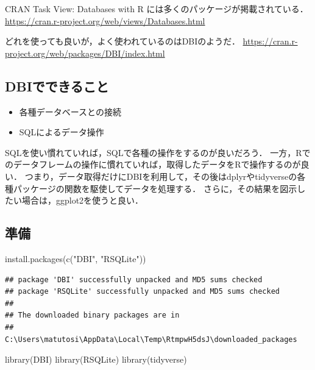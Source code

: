 \documentclass[
]{article}
\newenvironment{Shaded}{\begin{snugshade}}{\end{snugshade}}
\newcommand{\FunctionTok}[1]{\textcolor[rgb]{0.00,0.00,0.00}{#1}}
\newcommand{\NormalTok}[1]{#1}
\newcommand{\StringTok}[1]{\textcolor[rgb]{0.31,0.60,0.02}{#1}}
\providecommand{\tightlist}{%
  \setlength{\itemsep}{0pt}\setlength{\parskip}{0pt}}
\begin{document}
CRAN Task View: Databases with R には多くのパッケージが掲載されている．
\url{https://cran.r-project.org/web/views/Databases.html}

どれを使っても良いが，よく使われているのはDBIのようだ．
\url{https://cran.r-project.org/web/packages/DBI/index.html}

\hypertarget{dbiux3067ux3067ux304dux308bux3053ux3068}{%
\subsection{DBIでできること}\label{dbiux3067ux3067ux304dux308bux3053ux3068}}

\begin{itemize}
\tightlist
\item
  各種データベースとの接続\\
\item
  SQLによるデータ操作
\end{itemize}

SQLを使い慣れていれば，SQLで各種の操作をするのが良いだろう．
一方，Rでのデータフレームの操作に慣れていれば，取得したデータをRで操作するのが良い．
つまり，データ取得だけにDBIを利用して，その後はdplyrやtidyverseの各種パッケージの関数を駆使してデータを処理する．
さらに，その結果を図示したい場合は，ggplot2を使うと良い．

\hypertarget{ux6e96ux5099-5}{%
\subsection{準備}\label{ux6e96ux5099-5}}

\begin{Shaded}
\begin{Highlighting}[]
\FunctionTok{install.packages}\NormalTok{(}\FunctionTok{c}\NormalTok{(}\StringTok{"DBI"}\NormalTok{, }\StringTok{"RSQLite"}\NormalTok{))}
\end{Highlighting}
\end{Shaded}

\begin{verbatim}
## package 'DBI' successfully unpacked and MD5 sums checked
## package 'RSQLite' successfully unpacked and MD5 sums checked
## 
## The downloaded binary packages are in
##  C:\Users\matutosi\AppData\Local\Temp\RtmpwH5dsJ\downloaded_packages
\end{verbatim}

\begin{Shaded}
\begin{Highlighting}[]
\FunctionTok{library}\NormalTok{(DBI)}
\FunctionTok{library}\NormalTok{(RSQLite)}
\FunctionTok{library}\NormalTok{(tidyverse)}
\end{Highlighting}
\end{Shaded}
\end{document}

